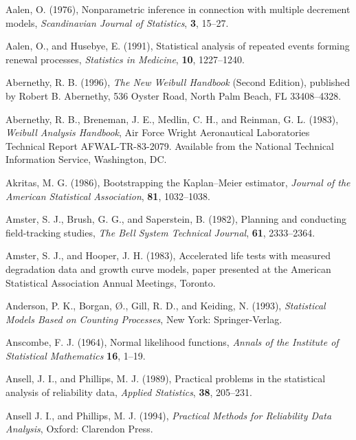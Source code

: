 \begin{thebibliography}{999}

Aalen, O. (1976), Nonparametric inference in connection with multiple
decrement models, {\em Scandinavian Journal of Statistics}, {\bf 3}, 15--27.

Aalen, O., and Husebye, E. (1991), Statistical analysis of repeated
events forming renewal processes, {\em Statistics in Medicine}, {\bf
10}, 1227--1240.

Abernethy, R. B. (1996), {\em The New Weibull Handbook} (Second
Edition), published by Robert B. Abernethy, 536 Oyster Road, North
Palm Beach, FL 33408--4328.

Abernethy, R. B., Breneman, J. E., Medlin, C. H., and Reinman, G. L.
(1983), {\em Weibull Analysis Handbook}, Air Force Wright Aeronautical
Laboratories Technical Report AFWAL-TR-83-2079. Available from the
National Technical Information Service, Washington, DC.

Akritas, M. G. (1986), Bootstrapping the Kaplan--Meier estimator, {\em
Journal of the American Statistical Association}, {\bf 81}, 1032--1038.

Amster, S. J., Brush, G. G., and Saperstein, B. (1982), Planning
and conducting field-tracking studies, {\em The Bell System
Technical Journal}, {\bf 61}, 2333--2364.

Amster, S. J., and Hooper, J. H. (1983), Accelerated life tests with
measured degradation data and growth curve models, paper presented
at the American Statistical Association Annual Meetings, Toronto.

Anderson, P. K., Borgan, \O., Gill, R. D., and Keiding, N. (1993),
{\em Statistical Models Based on Counting Processes}, New York:
Springer-Verlag.

Anscombe, F. J. (1964), Normal likelihood functions, {\em Annals of
the Institute of Statistical Mathematics} {\bf 16}, 1--19.

Ansell, J. I., and Phillips, M. J. (1989), Practical problems in the
statistical analysis of reliability data, {\em Applied Statistics},
{\bf 38}, 205--231.

Ansell J. I., and Phillips, M. J. (1994), {\em Practical Methods for
Reliability Data Analysis}, Oxford: Clarendon Press.


\end{thebibliography}

